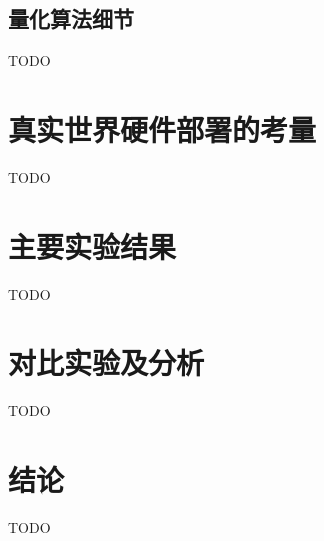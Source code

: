 \subsection{量化算法细节}
TODO

\section{真实世界硬件部署的考量}
TODO

\section{主要实验结果}
TODO

\section{对比实验及分析}
TODO

\section{结论}
TODO
